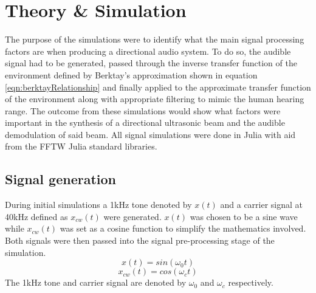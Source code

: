 \section{Theory \& Simulation}
The purpose of the simulations were to identify what the main signal processing factors are when producing a directional audio system. To do so, the audible signal had to be generated, passed through the inverse transfer function of the environment defined by Berktay's approximation shown in equation \ref{eqn:berktayRelationship} and finally applied to the approximate transfer function of the environment along with appropriate filtering to mimic the human hearing range. The outcome from these simulations would show what factors were important in the synthesis of a directional ultrasonic beam and the audible demodulation of said beam. All signal simulations were done in Julia \cite{bezanson2017julia} with aid from the FFTW\cite{Padua2011} Julia standard libraries.
\subsection{Signal generation}
During initial simulations a 1kHz tone denoted by $x(t)$ and a carrier signal at 40kHz defined as $x_{cw}(t)$ were generated. $x(t)$ was chosen to be a sine wave while $x_{cw}(t)$ was set as a cosine function to simplify the mathematics involved. Both signals were then passed into the signal pre-processing stage of the simulation.
\begin{equation}
    x(t) = sin(\omega_0 t)
\end{equation}
\begin{equation}
    x_{cw}(t) = cos(\omega_c t)
\end{equation}
The 1kHz tone and carrier signal are denoted by $\omega_0$ and $\omega_c$ respectively.

